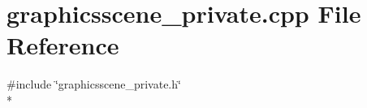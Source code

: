 \section{graphicsscene\+\_\+private.\+cpp File Reference}
\label{bk3_2graphicsscene__private_8cpp}
{\ttfamily \#include \char`\"{}graphicsscene\+\_\+private.\+h\char`\"{}}\\*
